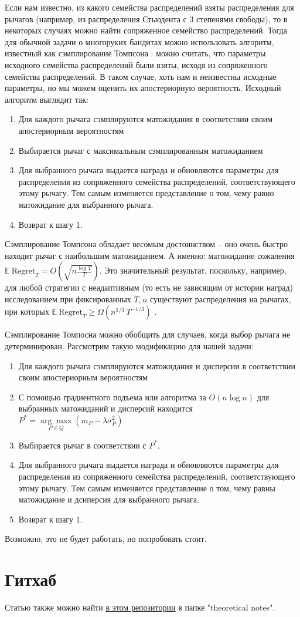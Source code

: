 \documentclass{article}
\begin{document}
Если нам известно, из какого семейства распределений взяты распределения для рычагов (например, из распределения Стьюдента с 3 степенями свободы), то в некоторых случаях можно найти сопряженное семейство распределений. Тогда для обычной задачи о многоруких бандитах можно использовать алгоритм, известный как сэмплирование Томпсона \cite{intro_bandits}: можно считать, что параметры исходного семейства распределений были взяты, исходя из сопряженного семейства распределений. В таком случае, хоть нам и неизвестны исходные параметры, но мы можем оценить их апостериорную вероятность. Исходный алгоритм выглядит так:
\begin{enumerate}
    \item Для каждого рычага сэмплируются матожидания в соответствии своим апостериорным вероятностям
    \item Выбирается рычаг с максимальным сэмплированным матожиданием
    \item Для выбранного рычага выдается награда и обновляются параметры для распределения из сопряженного семейства распределений, соответствующего этому рычагу. Тем самым изменяется представление о том, чему равно матожидание для выбранного рычага.
    \item Возврат к шагу 1.
\end{enumerate}
Сэмплирование Томпсона обладает весомым достоинством -- оно очень быстро находит рычаг с наибольшим матожиданием. А именно: матожидание сожаления $\mathbb{E} \: \overline{\text{Regret}_T} = O\left(\sqrt{n \frac{\log T}{T}} \right)$. Это значительный результат, поскольку, например, для любой стратегии с неадаптивным (то есть не зависящим от истории наград) исследованием при фиксированных $T, n$ существуют распределения на рычагах, при которых  $\mathbb{E} \: \overline{\text{Regret}_T} \geq \Omega \left(n^{1/3} \, T^{-1/3} \right)$ \cite{intro_bandits_slow_convergence}.

Сэмплирование Томпосна можно обобщить для случаев, когда выбор рычага не детерминирован. Рассмотрим такую модификацию для нашей задачи:
\begin{enumerate}
    \item Для каждого рычага сэмплируются матожидания и дисперсии в соответствии своим апостериорным вероятностям
    \item С помощью градиентного подъема или алгоритма за $O(n \log n)$ для выбранных матожиданий и дисперсий находится $P^* = \underset{P \in Q}{\arg \max} (m_P - \lambda \sigma_P^2)$
    \item Выбирается рычаг в соответствии с $P^*$.
    \item Для выбранного рычага выдается награда и обновляются параметры для распределения из сопряженного семейства распределений, соответствующего этому рычагу. Тем самым изменяется представление о том, чему равны матожидание и дсиперсия для выбранного рычага.
    \item Возврат к шагу 1.
\end{enumerate}

Возможно, это не будет работать, но попробовать стоит.

\section{Гитхаб}

 Статью также можно найти \href{https://github.com/davynchi/diploma/blob/main}{в этом репозитории} в папке "theoretical notes".



\end{document}
